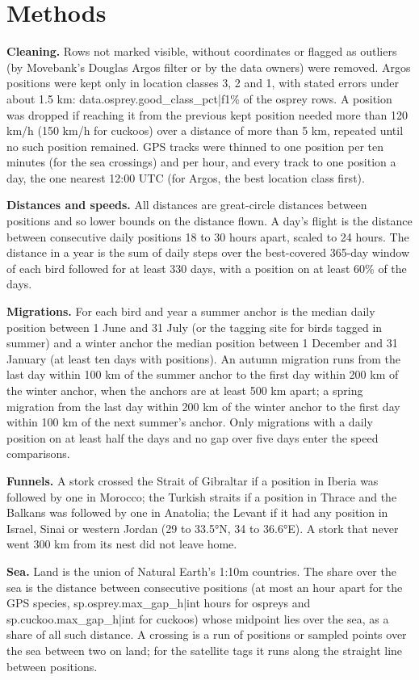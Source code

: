 \documentclass[11pt,a4paper]{article}
\begin{document}
\section{Methods}
\textbf{Cleaning.} Rows not marked visible, without coordinates or flagged as outliers (by Movebank's Douglas Argos filter \citep{douglas2012} or by the data owners) were removed. Argos positions were kept only in location classes 3, 2 and 1, with stated errors under about 1.5 km: {{data.osprey.good_class_pct|f1}}\% of the osprey rows. A position was dropped if reaching it from the previous kept position needed more than 120 km/h (150 km/h for cuckoos) over a distance of more than 5 km, repeated until no such position remained. GPS tracks were thinned to one position per ten minutes (for the sea crossings) and per hour, and every track to one position a day, the one nearest 12:00 UTC (for Argos, the best location class first).

\textbf{Distances and speeds.} All distances are great-circle distances between positions and so lower bounds on the distance flown. A day's flight is the distance between consecutive daily positions 18 to 30 hours apart, scaled to 24 hours. The distance in a year is the sum of daily steps over the best-covered 365-day window of each bird followed for at least 330 days, with a position on at least 60\% of the days.

\textbf{Migrations.} For each bird and year a summer anchor is the median daily position between 1 June and 31 July (or the tagging site for birds tagged in summer) and a winter anchor the median position between 1 December and 31 January (at least ten days with positions). An autumn migration runs from the last day within 100 km of the summer anchor to the first day within 200 km of the winter anchor, when the anchors are at least 500 km apart; a spring migration from the last day within 200 km of the winter anchor to the first day within 100 km of the next summer's anchor. Only migrations with a daily position on at least half the days and no gap over five days enter the speed comparisons.

\textbf{Funnels.} A stork crossed the Strait of Gibraltar if a position in Iberia was followed by one in Morocco; the Turkish straits if a position in Thrace and the Balkans was followed by one in Anatolia; the Levant if it had any position in Israel, Sinai or western Jordan (29 to 33.5°N, 34 to 36.6°E). A stork that never went 300 km from its nest did not leave home.

\textbf{Sea.} Land is the union of Natural Earth's 1:10m countries. The share over the sea is the distance between consecutive positions (at most an hour apart for the GPS species, {{sp.osprey.max_gap_h|int}} hours for ospreys and {{sp.cuckoo.max_gap_h|int}} for cuckoos) whose midpoint lies over the sea, as a share of all such distance. A crossing is a run of positions or sampled points over the sea between two on land; for the satellite tags it runs along the straight line between positions.
\end{document}
